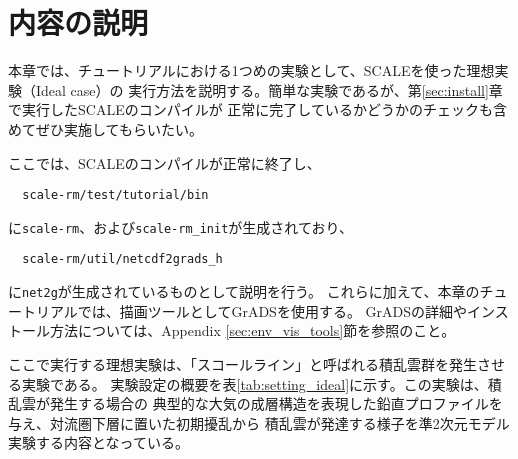 

\section{内容の説明}

本章では、チュートリアルにおける1つめの実験として、SCALEを使った理想実験（Ideal case）の
実行方法を説明する。簡単な実験であるが、第\ref{sec:install}章で実行したSCALEのコンパイルが
正常に完了しているかどうかのチェックも含めてぜひ実施してもらいたい。

ここでは、SCALEのコンパイルが正常に終了し、
\begin{verbatim}
  scale-rm/test/tutorial/bin
\end{verbatim}
に\verb|scale-rm|、および\verb|scale-rm_init|が生成されており、
\begin{verbatim}
  scale-rm/util/netcdf2grads_h
\end{verbatim}
に\verb|net2g|が生成されているものとして説明を行う。
これらに加えて、本章のチュートリアルでは、描画ツールとしてGrADSを使用する。
GrADSの詳細やインストール方法については、Appendix \ref{sec:env_vis_tools}節を参照のこと。


ここで実行する理想実験は、「スコールライン」と呼ばれる積乱雲群を発生させる実験である。
実験設定の概要を表\ref{tab:setting_ideal}に示す。この実験は、積乱雲が発生する場合の
典型的な大気の成層構造を表現した鉛直プロファイルを与え、対流圏下層に置いた初期擾乱から
積乱雲が発達する様子を準2次元モデル実験する内容となっている。


